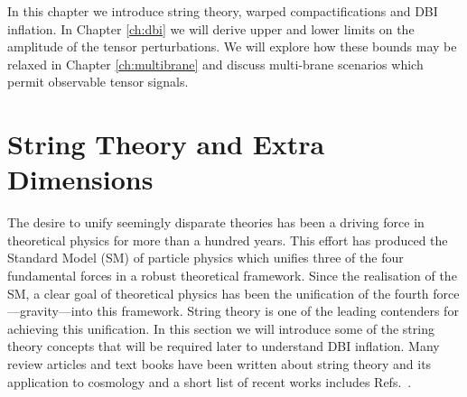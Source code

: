 In this chapter we introduce string theory, warped compactifications and DBI inflation.
In Chapter \ref{ch:dbi} we will derive upper and lower 
limits on the amplitude of the tensor perturbations.  
We will explore how these bounds may be relaxed in Chapter \ref{ch:multibrane} and discuss
multi-brane 
scenarios which permit observable tensor signals. 

\section{String Theory and Extra Dimensions}
\label{sec:extradims}
The desire to unify seemingly disparate theories has been a driving force in
theoretical physics for more than a hundred years. This effort has produced 
the Standard Model (SM) of particle physics which unifies three of the four
fundamental forces in a robust theoretical framework. Since the realisation of
the SM, a clear goal of theoretical physics has been the unification of the
fourth force---gravity---into this framework. String theory is one of the leading
contenders for achieving this unification. 
In this section we will introduce
some of the string theory concepts that will be required later to understand DBI
inflation.
Many review articles and text books have been written about string theory and
its application to cosmology and a short list of recent works includes
Refs.~\cite{cline, Johnson2000, Baumann:2009ni,Kallosh:2007wm,
Linde:2005dd,McAllister:2007bg}.


